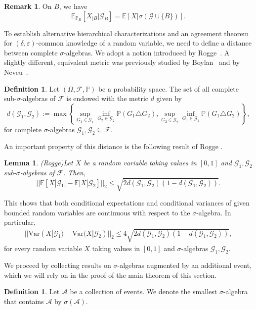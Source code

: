 \documentclass[a4paper, 10pt]{article}
\numberwithin{theorem}{section}
\newtheorem{lemma}[theorem]{Lemma}
\theoremstyle{definition}
\newtheorem{definition}[theorem]{Definition}
\newtheorem{remark}[theorem]{Remark}
\newcommand{\E}{\mathbb{E}}
\newcommand{\A}{\mathcal{A}}
\newcommand{\F}{\mathcal{F}}
\newcommand{\G}{\mathcal{G}}
\newcommand{\Var}{\mathrm{Var}}
\renewcommand{\epsilon}{\varepsilon}
\renewcommand{\P}{\mathbb{P}}
\begin{document}
\begin{remark}
	On $B$, we have $$\E_{\P_B}[X_{|B}|\G_{B}]=\E[X|\sigma(\G \cup \{B\}) ].$$
\end{remark}



To establish alternative hierarchical characterizations and an agreement theorem for $(\delta,\epsilon)$-common knowledge of a random variable, we need to define a distance between complete $\sigma$-algebras. We adopt a notion introduced by Rogge~\cite{Ro74}. A slightly different, equivalent metric was previously studied by Boylan~\cite{Bo71} and by Neveu~\cite{Ne72}.


\begin{definition}
	Let $(\Omega, \F, \P)$ be a probability space. The set of all complete sub-$\sigma$-algebras of $\F$ is endowed with the metric $d$ given by
	$$
    d(\G_1,\G_2):= \max \left\{ \sup_{G_1 \in \G_1} \inf_{G_2\in\G_2} \P(G_1 \triangle G_2) , \sup_{G_2\in \G_2} \inf_{G_1\in\G_1} \P(G_1\triangle G_2)\right\},
    $$
	for complete $\sigma$-algebras $\G_1,\G_2 \subseteq \F$.
\end{definition}

An important property of this distance is the following result of Rogge \cite{Ro74}.

\begin{lemma}{(Rogge)}\label{lemma:rogge}
	Let $X$ be a random variable taking values in $[0,1]$ and $\G_1, \G_2$ sub-$\sigma$-algebras of $\F$. Then,
	$$  || \E[X|\G_1]-\E[X|\G_2]||_2 	\leq \sqrt{2 d(\G_1,\G_2)(1-d(\G_1,\G_2))}.$$
\end{lemma}

This shows that both conditional expectations and conditional variances of given bounded random variables are continuous with respect to the $\sigma$-algebra. In particular, 
	\begin{align}\label{align:bedingte_varianz_ist_stetig}
	||\Var(X|\G_1)-\Var(X|\G_2)||_2 \leq 4\sqrt{2d(\G_1,\G_2) (1-d(\G_1,\G_2))},
	\end{align}
for every random variable $X$ taking values in $[0,1]$ and $\sigma$-algebras $\G_1,\G_2$.

We proceed by collecting results on $\sigma$-algebras augmented by an additional event, which we will rely on in the proof of the main theorem of this section.

\begin{definition}
	Let $\A$ be a collection of events. We denote the smallest $\sigma$-algebra that contains $\A$ by $\sigma(\A)$.
\end{definition}
\end{document}
